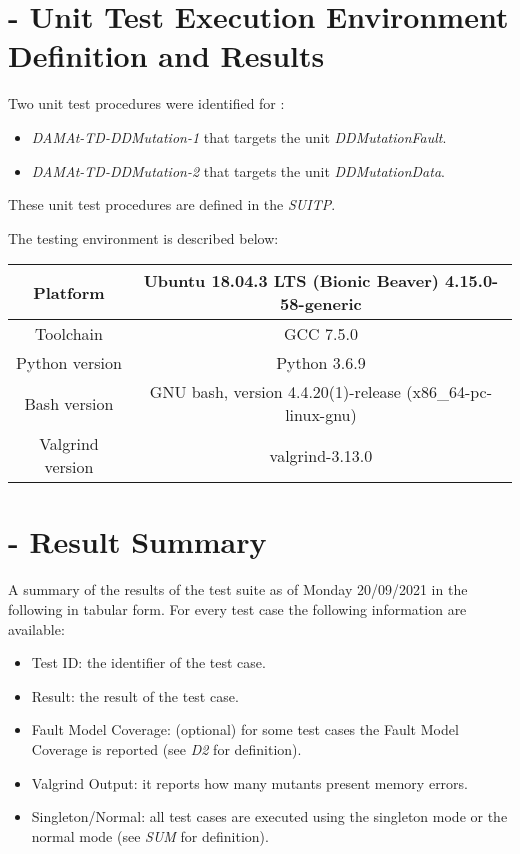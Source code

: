 
\chapter{\DAMA - Unit Test Execution Environment Definition and Results}

Two unit test procedures were identified for \DAMA:
\begin{itemize}
  \item {\emph{DAMAt-TD-DDMutation-1}} that targets the unit \emph{DDMutationFault}.
  \item {\emph{DAMAt-TD-DDMutation-2}} that targets the unit \emph{DDMutationData}.
\end{itemize}

These unit test procedures are defined in the \emph{SUITP}.

The testing environment is described below:

\begin{center}
\begin{tabular}{ |c|c| }
 \hline
 Platform & Ubuntu 18.04.3 LTS (Bionic Beaver) 4.15.0-58-generic \\
 \hline
 Toolchain & GCC 7.5.0 \\
 \hline
 Python version & Python 3.6.9 \\
 \hline
 Bash version & GNU bash, version 4.4.20(1)-release (x86\_64-pc-linux-gnu) \\
 \hline
 Valgrind version & valgrind-3.13.0 \\
 \hline
\end{tabular}
\end{center}


\chapter{\DAMA - Result Summary}

A summary of the results of the test suite as of Monday 20/09/2021 in the following in tabular form.
For every test case the following information are available:
\begin{itemize}
  \item{Test ID}: the identifier of the test case.
  \item{Result}: the result of the test case.
  \item{Fault Model Coverage}: (optional) for some test cases the Fault Model Coverage is reported (see \emph{D2} for definition).
  \item{Valgrind Output}: it reports how many mutants present memory errors.
  \item{Singleton/Normal}: all test cases are executed using the singleton mode or the normal mode (see \emph{SUM} for definition).
\end{itemize}

